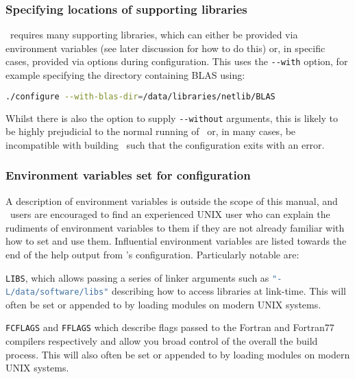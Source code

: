 \subsubsection{Specifying locations of supporting libraries}
\label{sec:configure_locate_supporting_libs}

\fluidity\ requires many supporting libraries, which can either be provided via
environment variables (see later discussion for how to do this) or, in specific
cases, provided via options during configuration. This uses the
\lstinline[language=Bash]+--with+ option, for example specifying the directory
containing BLAS using:

\begin{lstlisting}[language=Bash]
./configure --with-blas-dir=/data/libraries/netlib/BLAS
\end{lstlisting}

Whilst there is also the option to supply \lstinline[language=Bash]+--without+
arguments, this is likely to be highly prejudicial to the normal running of
\fluidity\ or, in many cases, be incompatible with building \fluidity\ such that
the configuration exits with an error.

\subsubsection{Environment variables set for configuration}
\label{sec:configure_environment_vars}

A description of environment variables is outside the scope of this manual, and
\fluidity\ users are encouraged to find an experienced UNIX user who can explain
the rudiments of environment variables to them if they are not already familiar
with how to set and use them. Influential environment variables are listed
towards the end of the help output from \fluidity's configuration. Particularly
notable are:

\lstinline[language=Bash]+LIBS+, which allows passing a series of linker
arguments such as \lstinline[language=Bash]+"-L/data/software/libs"+ describing
how to access libraries at link-time. This will often be set or appended to by
loading modules on modern UNIX systems.

\lstinline[language=Bash]+FCFLAGS+ and \lstinline[language=Bash]+FFLAGS+ which
describe flags passed to the Fortran and Fortran77 compilers respectively and
allow you broad control of the overall the build process. This will also often
be set or appended to by loading modules on modern UNIX systems.

